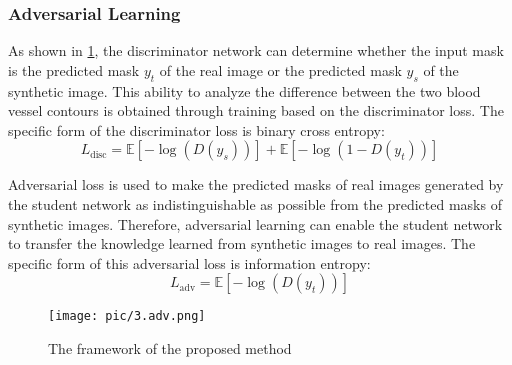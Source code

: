 
\subsubsection{Adversarial Learning}
As shown in \cref{fig:Adversarial}, the discriminator network can determine whether the input mask is the predicted mask $y_t$ of the real image or the predicted mask $y_s$ of the synthetic image. This ability to analyze the difference between the two blood vessel contours is obtained through training based on the discriminator loss. The specific form of the discriminator loss is binary cross entropy:
\begin{equation}
L_{\text{disc}} = \mathbb{E}[-\log(D(y_s))] + \mathbb{E}[-\log(1 - D(y_t))]
\end{equation}

Adversarial loss is used to make the predicted masks of real images generated by the student network as indistinguishable as possible from the predicted masks of synthetic images. Therefore, adversarial learning can enable the student network to transfer the knowledge learned from synthetic images to real images. The specific form of this adversarial loss is information entropy:
\begin{equation}
L_{\text{adv}} = \mathbb{E}[-\log(D(y_t))]
\end{equation}

\begin{figure}[htbp]
  \centering
  \texttt{[image: pic/3.adv.png]}
  \caption{The framework of the proposed method}
  \label{fig:Adversarial}
\end{figure}

